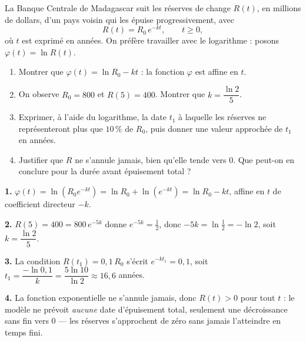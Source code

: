 \begin{jecherche}
La Banque Centrale de Madagascar suit les réserves de change $R(t)$, en
millions de dollars, d'un pays voisin qui les épuise progressivement, avec
\[
  R(t) = R_{0}\, e^{-kt}, \qquad t \geq 0,
\]
où $t$ est exprimé en années. On préfère travailler avec le logarithme :
posons $\varphi(t) = \ln R(t)$.

\begin{enumerate}[label=\textbf{\arabic*.}, leftmargin=*, itemsep=0.3em]
  \item Montrer que $\varphi(t) = \ln R_{0} - kt$ : la fonction $\varphi$ est
        affine en $t$.
  \item On observe $R_{0} = 800$ et $R(5) = 400$. Montrer que
        $k = \dfrac{\ln 2}{5}$.
  \item Exprimer, à l'aide du logarithme, la date $t_{1}$ à laquelle les
        réserves ne représenteront plus que $10\,\%$ de $R_{0}$, puis donner
        une valeur approchée de $t_{1}$ en années.
  \item Justifier que $R$ ne s'annule jamais, bien qu'elle tende vers $0$.
        Que peut-on en conclure pour la durée avant épuisement total ?
\end{enumerate}
\end{jecherche}

\begin{corrige}
\textbf{1.} $\varphi(t) = \ln\left(R_{0}e^{-kt}\right) = \ln R_{0} + \ln\left(e^{-kt}\right)
= \ln R_{0} - kt$, affine en $t$ de coefficient directeur $-k$.

\textbf{2.} $R(5) = 400 = 800\,e^{-5k}$ donne $e^{-5k} = \tfrac12$, donc
$-5k = \ln\tfrac12 = -\ln 2$, soit $k = \dfrac{\ln 2}{5}$.

\textbf{3.} La condition $R(t_{1}) = 0{,}1\,R_{0}$ s'écrit
$e^{-kt_{1}} = 0{,}1$, soit $t_{1} = \dfrac{-\ln 0{,}1}{k}
= \dfrac{5\ln 10}{\ln 2} \approx 16{,}6$ années.

\textbf{4.} La fonction exponentielle ne s'annule jamais, donc $R(t) > 0$
pour tout $t$ : le modèle ne prévoit \emph{aucune} date d'épuisement total,
seulement une décroissance sans fin vers $0$ — les réserves s'approchent de
zéro sans jamais l'atteindre en temps fini.
\end{corrige}


